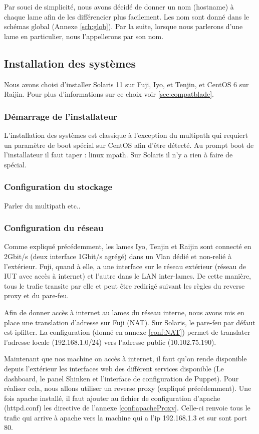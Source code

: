 \documentclass[a4paper,oneside]{report}
\begin{document}
Par souci de simplicité, nous avons décidé de donner un nom (hostname) à chaque lame afin de les différencier plus facilement.
Les nom sont donné dans le schémas global (Annexe \ref{sch:glob}).
Par la suite, lorsque nous parlerons d'une lame en particulier, nous l'appellerons par son nom.

\subsection{Installation des systèmes}
Nous avons choisi d'installer Solaris 11 sur Fuji, Iyo, et Tenjin, et CentOS 6 sur Raijin.
Pour plus d'informations sur ce choix voir \ref{sec:compatblade}.

\subsubsection{Démarrage de l'installateur}
L'installation des systèmes est classique à l'exception du multipath qui requiert un paramètre de boot spécial sur CentOS afin d'être détecté.
Au prompt boot de l'installateur il faut taper : linux mpath.\newline
Sur Solaris il n'y a rien à faire de spécial.

\subsubsection{Configuration du stockage}
Parler du multipath etc..

\subsubsection{Configuration du réseau}
Comme expliqué précédemment, les lames Iyo, Tenjin et Raijin sont connecté en 2Gbit/s (deux interface 1Gbit/s agrégé) dans un Vlan dédié et non-relié à l'extérieur.
Fuji, quand à elle, a une interface sur le réseau extérieur (réseau de IUT avec accès à internet) et l'autre dans le LAN inter-lames.
De cette manière, tous le trafic transite par elle et peut être redirigé suivant les règles du reverse proxy et du pare-feu. 

Afin de donner accès à internet au lames du réseau interne, nous avons mis en place une translation d'adresse sur Fuji (NAT).
Sur Solaris, le pare-feu par défaut est ipfilter. La configuration (donné en annexe \ref{conf:NAT}) permet de translater l'adresse locale (192.168.1.0/24) vers l'adresse public (10.102.75.190).

Maintenant que nos machine on accès à internet, il faut qu'on rende disponible depuis l'extérieur les interfaces web des différent services disponible (Le dashboard, le panel Shinken et l'interface de configuration de Puppet).
Pour réaliser cela, nous allons utiliser un reverse proxy (expliqué précédemment). Une fois apache installé, il faut ajouter au fichier de configuration d'apache (httpd.conf) les directive de l'annexe \ref{conf:apacheProxy}.
Celle-ci renvoie tous le trafic qui arrive à apache vers la machine qui a l'ip 192.168.1.3 et sur sont port 80.
\end{document}
